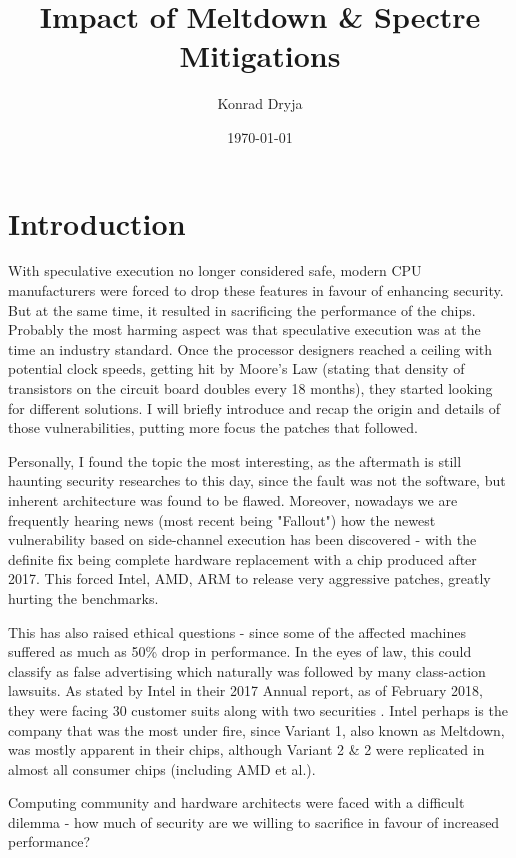 \documentclass{csfourzero}
\title{Impact of Meltdown \& Spectre Mitigations}
\author{Konrad Dryja}
\date{\today}
\begin{document}
\maketitle


\section{Introduction}
\label{sec:intro}
With speculative execution no longer considered safe, modern CPU manufacturers were forced to drop these features in favour of enhancing security. But at the same time, it resulted in sacrificing the performance of the chips. Probably the most harming aspect was that speculative execution was at the time an industry standard. Once the processor designers reached a ceiling with potential clock speeds, getting hit by Moore's Law \cite{schaller1997moore} (stating that density of transistors on the circuit board doubles every 18 months), they started looking for different solutions. I will briefly introduce and recap the origin and details of those vulnerabilities, putting more focus the patches that followed.  

Personally, I found the topic the most interesting, as the aftermath is still haunting security researches to this day, since the fault was not the software, but inherent architecture was found to be flawed. Moreover, nowadays we are frequently hearing news (most recent being "Fallout"\cite{fallout}) how the newest vulnerability based on side-channel execution has been discovered - with the definite fix being complete hardware replacement with a chip produced after 2017. This forced Intel, AMD, ARM to release very aggressive patches, greatly hurting the benchmarks.

This has also raised ethical questions - since some of the affected machines suffered as much as 50\% drop in performance. In the eyes of law, this could classify as false advertising which naturally was followed by many class-action lawsuits. As stated by Intel in their 2017 Annual report, as of February 2018, they were facing 30 customer suits along with two securities \cite{intelreport}. Intel perhaps is the company that was the most under fire, since Variant 1, also known as Meltdown, was mostly apparent in their chips, although Variant 2 \& 2 were replicated in almost all consumer chips (including AMD et al.).

Computing community and hardware architects were faced with a difficult dilemma - how much of security are we willing to sacrifice in favour of increased performance?
\end{document}
